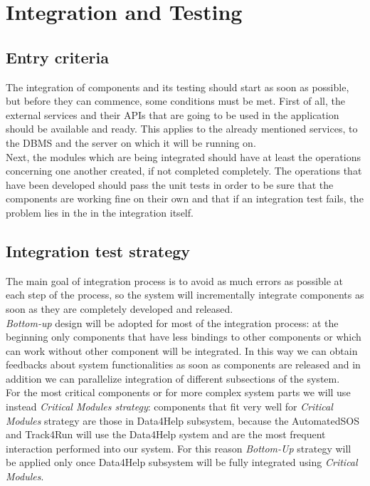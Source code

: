 \documentclass[a4paper, hidelinks, 12pt]{report}
\begin{document}
\section{Integration and Testing}
\subsection{Entry criteria} 
The integration of components and its testing should start as soon as possible, but before they can commence, some conditions must be met. First of all, the external services and their APIs that are going to be used in the application should be available and ready. This applies to the already mentioned services, to the DBMS and the server on which it will be running on. \\

Next, the modules which are being integrated should have at least the operations concerning one another created, if not completed completely. The operations that have been developed should pass the unit tests in order to be sure that the components are working fine on their own and that if an integration test fails, the problem lies in the in the integration itself.\\

\subsection{Integration test strategy}  
The main goal of integration process is to avoid as much
errors as possible at each step of the process, so the system will incrementally integrate components as soon as they are completely developed and released.\\

\textit{Bottom-up} design will be adopted for most of the integration process: at the beginning only components that have less bindings to other components or which can work without other component will be integrated. In this way we can obtain feedbacks
about system functionalities as soon as components are released and in addition we can parallelize integration of different subsections of the system.\\

For the most critical components or for more complex system parts we will use instead \textit{Critical Modules strategy}: components that fit very well for \textit{Critical Modules} strategy are those in Data4Help subsystem, because the AutomatedSOS and Track4Run will use the Data4Help system and are the most frequent interaction performed into our system. For this reason \textit{Bottom-Up} strategy will be applied only once Data4Help subsystem will be fully integrated using \textit{Critical Modules}.
\end{document}
